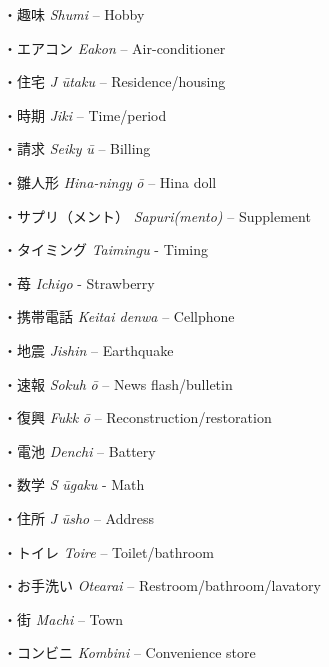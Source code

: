 \par{・趣味 \emph{Shumi }– Hobby }

\par{・エアコン \emph{Eakon }– Air-conditioner }

\par{・住宅 \emph{J }\emph{ūtaku }– Residence\slash housing }

\par{・時期 \emph{Jiki }– Time\slash period }

\par{・請求 \emph{Seiky }\emph{ū }– Billing }

\par{・雛人形 \emph{Hina-ningy }\emph{ō }– Hina doll }

\par{・サプリ（メント） \emph{Sapuri(mento) }– Supplement }

\par{・タイミング \emph{Taimingu }- Timing }

\par{・苺 \emph{Ichigo }- Strawberry }

\par{・携帯電話 \emph{Keitai denwa }– Cellphone }

\par{・地震 \emph{Jishin }– Earthquake }

\par{・速報 \emph{Sokuh }\emph{ō }– News flash\slash bulletin }

\par{・復興 \emph{Fukk }\emph{ō }– Reconstruction\slash restoration }

\par{・電池 \emph{Denchi }– Battery }

\par{・数学 \emph{S }\emph{ūgaku }- Math }

\par{・住所 \emph{J }\emph{ūsho }– Address }

\par{・トイレ \emph{Toire }– Toilet\slash bathroom }

\par{・お手洗い \emph{Otearai }– Restroom\slash bathroom\slash lavatory }

\par{・街 \emph{Machi }– Town }

\par{・コンビニ \emph{Kombini }– Convenience store }

